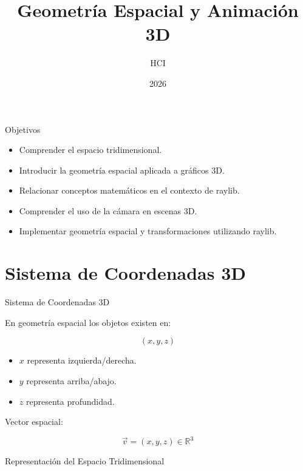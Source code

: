 \documentclass{beamer}
\title{Geometría Espacial y Animación 3D}
\author{HCI}
\date{2026}
\begin{document}
\begin{frame}
\titlepage
\end{frame}

\begin{frame}{Objetivos}

\begin{itemize}
    \item Comprender el espacio tridimensional.
    \item Introducir la geometría espacial aplicada a gráficos 3D.
    \item Relacionar conceptos matemáticos en el contexto de raylib.
    \item Comprender el uso de la cámara en escenas 3D.
    \item Implementar geometría espacial y transformaciones utilizando raylib.
\end{itemize}

\end{frame}


\section{Sistema de Coordenadas 3D}

\begin{frame}{Sistema de Coordenadas 3D}

En geometría espacial los objetos existen en:

$$
(x,y,z)
$$

\vspace{0.3cm}

\begin{itemize}
    \item $x$ representa izquierda/derecha.
    \item $y$ representa arriba/abajo.
    \item $z$ representa profundidad.
\end{itemize}

\vspace{0.5cm}

Vector espacial:

$$
    \vec{v}=(x,y,z) \in \mathbb{R}^3
$$

\end{frame}

\begin{frame}{Representación del Espacio Tridimensional}

\begin{center}
\end{center}

\end{frame}
\end{document}
